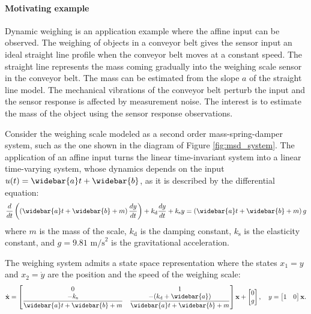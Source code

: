 \paragraph{Motivating example}
Dynamic weighing is an application example where the affine input can be observed.
The weighing of objects in a conveyor belt gives the sensor input an ideal straight line profile when the conveyor belt moves at a constant speed.
The straight line represents the mass coming gradually into the weighing scale sensor in the conveyor belt.
The mass can be estimated from the slope $a$ of the straight line model. 
The mechanical vibrations of the conveyor belt perturb the input and the sensor response is affected by measurement noise.
The interest is to estimate the mass of the object using the sensor response observations.

Consider the weighing scale modeled as a second order mass-spring-damper system, such as the one shown in the diagram of Figure \ref{fig:msd_system}.
The application of an affine input turns the linear time-invariant system into a linear time-varying system, whose
dynamics depends on the input $u(t) = \widebar{a} t + \widebar{b}$, as it is described by the differential equation:
\begin{equation} \dfrac{d}{dt} \left( \left( \widebar{a} t + \widebar{b} + m \right) \dfrac{dy}{dt} \right) + k_{\mathrm{d}} \dfrac{dy}{dt} + k_{\mathrm{s}} y = \left( \widebar{a} t + \widebar{b} + m \right) g \end{equation}
where $m$ is the mass of the scale, $k_{\mathrm{d}}$ is the damping constant, $k_{\mathrm{s}}$ is the elasticity constant, and $g = 9.81$ $\mathrm{m/s}^2$ is the gravitational acceleration. 

The weighing system admits a state space representation where the states $x_1=y$ and $x_2=\dot{y}$ are the position and the speed of the weighing scale: 
\[ \dot{\mathbf{x}} = \begin{bmatrix} 0 & 1 \\ \dfrac{-k_{\mathrm{s}}}{\widebar{a} t + \widebar{b} + m} & \dfrac{-(k_{\mathrm{d}} + \widebar{a})}{\widebar{a} t + \widebar{b} + m} \end{bmatrix} \mathbf{x} + \begin{bmatrix} 0 \\ g \end{bmatrix},  \quad y = \begin{bmatrix} 1 & 0  \end{bmatrix} \mathbf{x} . \]


